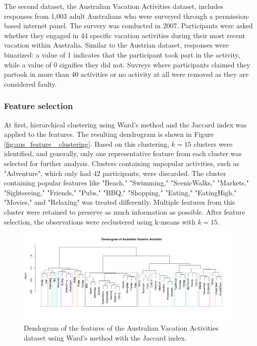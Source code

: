 \documentclass[article]{ajs}
\begin{document}
The second dataset, the Australian Vacation Activities dataset, includes responses from 1,003 adult Australians who were surveyed through a permission-based internet panel. The survery was conducted in 2007. Participants were asked whether they engaged in 44 specific vacation activities during their most recent vacation within Australia. Similar to the Austrian dataset, responses were binarized: a value of 1 indicates that the participant took part in the activity, while a value of 0 signifies they did not. Suvreys where participants claimed they partook in more than 40 activities or no activity at all were removed as they are considered faulty.

\subsubsection{Feature selection}

At first, hierarchical clustering using Ward's method \citep{ward2} and the Jaccard index was applied to the features. The resulting dendrogram is shown in Figure \ref{fig:aus_feature _clustering}. Based on this clustering, \( k = 15 \) clusters were identified, and generally, only one representative feature from each cluster was selected for further analysis. Clusters containing unpopular activities, such as "Adventure", which only had 42 participants, were discarded. The cluster containing popular features like "Beach," "Swimming," "ScenicWalks," "Markets," "Sightseeing," "Friends," "Pubs," "BBQ," "Shopping," "Eating," "EatingHigh," "Movies," and "Relaxing" was treated differently. Multiple features from this cluster were retained to preserve as much information as possible. After feature selection, the observations were reclustered using k-means with \( k = 15 \).


\begin{figure}[h!]
    \centering
    \includegraphics[width=1\textwidth]{aus_feature_clustering.png}
    \caption{Dendogram of the features of the Australian Vacation Activities dataset using Ward's method with the Jaccard index.}
    \label{fig:aus_feature_clustering}
\end{figure}
\end{document}
